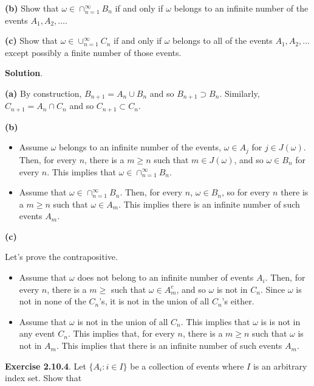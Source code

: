 \textbf{(b)} Show that \(\omega \in \cap_{n = 1}^\infty B_n\) if and
only if \(\omega\) belongs to an infinite number of the events
\(A_1, A_2, \dots\).

\textbf{(c)} Show that \(\omega \in \cup_{n = 1}^\infty C_n\) if and
only if \(\omega\) belongs to all of the events \(A_1, A_2, \dots\)
except possibly a finite number of those events.

\textbf{Solution}.

\textbf{(a)} By construction, \(B_{n+1} = A_n \cup B_n\) and so
\(B_{n + 1} \supset B_n\). Similarly, \(C_{n+1} = A_n \cap C_n\) and so
\(C_{n + 1} \subset C_n\).

\textbf{(b)}

\begin{itemize}
\item
  Assume \(\omega\) belongs to an infinite number of the events,
  \(\omega \in A_j\) for \(j \in J(\omega)\). Then, for every \(n\),
  there is a \(m \geq n\) such that \(m \in J(\omega)\), and so
  \(\omega \in B_n\) for every \(n\). This implies that
  \(\omega \in \cap_{n = 1}^\infty B_n\).
\item
  Assume that \(\omega \in \cap_{n = 1}^\infty B_n\). Then, for every
  \(n\), \(\omega \in B_n\), so for every \(n\) there is a \(m \geq n\)
  such that \(\omega \in A_m\). This implies there is an infinite number
  of such events \(A_m\).
\end{itemize}

\textbf{(c)}

Let's prove the contrapositive.

\begin{itemize}[tightlist]
\item
  Assume that \(\omega\) does not belong to an infinite number of events
  \(A_i\). Then, for every \(n\), there is a \(m \geq\) such that
  \(\omega \in A_m^c\), and so \(\omega\) is not in \(C_n\). Since
  \(\omega\) is not in none of the \(C_n\)'s, it is not in the union of
  all \(C_n\)'s either.
\item
  Assume that \(\omega\) is not in the union of all \(C_n\). This
  implies that \(\omega\) is is not in any event \(C_n\). This implies
  that, for every \(n\), there is a \(m \geq n\) such that \(\omega\) is
  not in \(A_m\). This implies that there is an infinite number of such
  events \(A_m\).
\end{itemize}

\textbf{Exercise 2.10.4}. Let \(\{ A_i : i \in I \}\) be a collection of
events where \(I\) is an arbitrary index set. Show that

